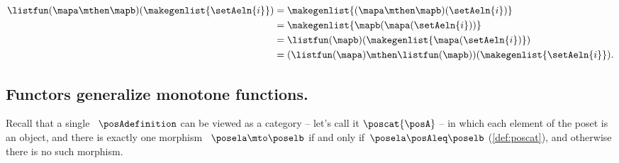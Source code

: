 \begin{example}
    \begin{equation}\label{eq:list-functor-compositionality}
        \begin{aligned}
            \listfun(\mapa \mthen \mapb)(\makegenlist{\setAeln{i}}) & =\makegenlist{ (\mapa \mthen \mapb)(\setAeln{i})} \\
                                                                    & =\makegenlist{  \mapb ( \mapa (\setAeln{i}))} \\
                                                                    & =\listfun(\mapb)(\makegenlist{\mapa(\setAeln{i})}) \\
                                                                    & =(\listfun(\mapa)\mthen \listfun(\mapb))(\makegenlist{\setAeln{i}}).
        \end{aligned}
    \end{equation}
\end{example}




\subsection{Functors generalize monotone functions.}
\label{sec:posetsarecats}


Recall that a single ~$\posAdefinition$ can be viewed as a category -- let's call it $\poscat{\posA}$ -- in which each element of the poset is an object, and there is exactly one morphism ~$\posela \mto \poselb$ if and only if~$\posela \posAleq \poselb$ (\cref{def:poscat}), and otherwise there is no such morphism.



